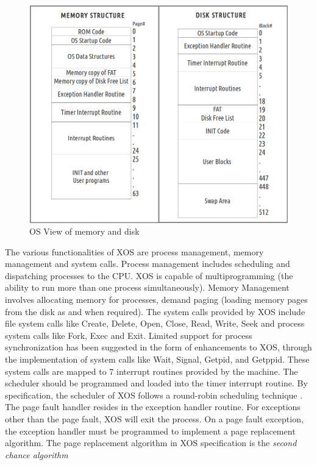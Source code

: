 \documentclass{sig-alternate}
\begin{document}
\begin{figure}[hbtp]
\centering
\includegraphics[scale=0.236]{memdiskstructure.png}
\caption{OS View of memory and disk}
\end{figure}

The various functionalities of XOS are process management, memory management and system calls. Process management includes scheduling and dispatching processes to the CPU. XOS is capable of multiprogramming (the ability to run more than one process simultaneously). Memory Management involves allocating memory for processes, demand paging (loading memory pages from the disk as and when required). The system calls provided by XOS include file system calls like Create, Delete, Open, Close, Read, Write, Seek and process system calls like Fork, Exec and Exit. Limited support for process synchronization has been suggested in the form of enhancements to XOS, through the implementation of system calls like Wait, Signal, Getpid, and Getppid. These system calls are mapped to 7 interrupt routines provided by the machine. The scheduler should be programmed and loaded into the timer interrupt routine. By specification, the scheduler of XOS follows a round-robin scheduling technique \cite{silberschatz}. The page fault handler resides in the exception handler routine. For exceptions other than the page fault, XOS will exit the process. On a page fault exception, the exception handler must be programmed to implement a page replacement algorithm. The page replacement algorithm in XOS specification is the \textit{second chance algorithm}\cite{silberschatz} \\
\end{document}
